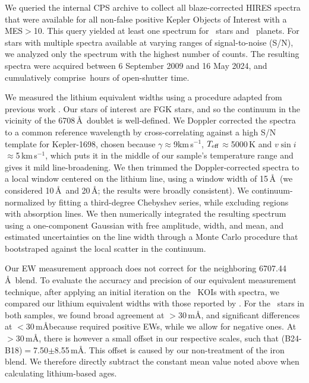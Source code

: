 \documentclass[11pt,twocolumn,tighten]{aastex63}
\newcommand{\kms}{{km\,s$^{-1}$}}
\begin{document}
We queried the internal CPS archive to collect all blaze-corrected
HIRES spectra that were available for all non-false positive Kepler
Objects of Interest with a MES$>$10.  This query yielded at least one
spectrum for \nlithiumstars\ stars and \nlithiumplanets\ planets.  For
stars with multiple spectra available at varying ranges of
signal-to-noise (S/N), we analyzed only the spectrum with the highest
number of counts.  The resulting spectra were acquired between 6
September 2009 and 16 May 2024, and cumulatively comprise
\nhireshours\,hours of open-shutter time.

We measured the lithium equivalent widths using a procedure
adapted from previous work \citep{Bouma_2021}.  Our stars of interest
are FGK stars, and so the continuum in the vicinity of the 
6708\,\AA\ doublet is well-defined.  We Doppler corrected the spectra
to a common reference wavelength by cross-correlating against a high
S/N template for Kepler-1698, chosen because $\gamma$$\approx$9\kms,
$T_{\rm eff}$$\approx$5000\,K and $v\sin i$$\approx$5\,\kms, which
puts it in the middle of our sample's temperature range and gives it
mild line-broadening.  We then trimmed the Doppler-corrected spectra
to a local window centered on the lithium line, using a window width
of 15\,\AA\ (we considered 10\,\AA\ and 20\,\AA; the results were
broadly consistent).  We continuum-normalized by fitting a
third-degree Chebyshev series, while excluding regions with
absorption lines.  We then numerically integrated the resulting
spectrum using a one-component Gaussian with free amplitude, width,
and mean, and estimated uncertainties on the line width through a
Monte Carlo procedure that bootstraped against the local scatter in
the continuum.

Our EW measurement approach does not correct for the neighboring
 6707.44\,\AA\ blend.  To evaluate the accuracy and
precision of our equivalent measurement technique, after applying an
initial iteration on the \nlithiumstars\ KOIs with spectra, we
compared our lithium equivalent widths with those reported by
\citet{2018ApJ...855..115B}.  For the \nbergeroverlap\ stars in both
samples, we found broad agreement at $>$30\,m\AA, and significant
differences at $<$30\,m\AA because \citet{2018ApJ...855..115B}
required positive EWs, while we allow for negative ones.  At
$>$30\,m\AA, there is however a small offset in our respective
scales, such that (B24-B18)$=$7.50$\pm$8.55\,m\AA.  This offset is
caused by our non-treatment of the iron blend.  We therefore directly
subtract the constant mean value noted above when calculating
lithium-based ages.
\end{document}
